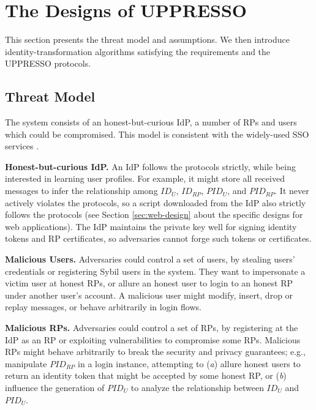 
\section{The Designs of UPPRESSO}
\label{sec:UPPRESSO}

This section presents the threat model and assumptions.
We then introduce identity-transformation algorithms satisfying the requirements
    and the UPPRESSO protocols.


\subsection{Threat Model}
The system consists of an honest-but-curious IdP, a number of RPs and users which could be compromised. %
This model is consistent with the widely-used SSO services \cite{OpenIDConnect,rfc6749,SAML,SAMLIdentifier,NIST2017draft}.

\noindent \textbf{Honest-but-curious IdP.}
An IdP follows the protocols strictly, while being interested in learning user profiles.
For example, it might store all received messages
 to infer the relationship among $ID_U$, $ID_{RP}$, $PID_{U}$, and $PID_{RP}$.
It never actively violates the protocols,
so a script downloaded from the IdP also strictly follows the protocols (see Section \ref{sec:web-design} about the specific designs
    for web applications).
The IdP maintains the private key well for signing identity tokens and RP certificates, %
so adversaries cannot forge such tokens or certificates.

\noindent \textbf{Malicious Users.}
Adversaries could control a set of users,
 by stealing users' credentials or registering Sybil users in the system.
They want to impersonate a victim user at honest RPs,
 or allure an honest user to login to an honest RP under another user's account.
A malicious user might
    modify, insert, drop or replay messages, or behave arbitrarily in login flows.

\noindent \textbf{Malicious RPs.}
Adversaries could control a set of RPs, by registering at the IdP as an RP
     or exploiting vulnerabilities to compromise some RPs.
Malicious RPs might behave arbitrarily to break the security and privacy guarantees;
e.g., manipulate $PID_{RP}$ in a login instance,
    attempting to (\emph{a}) allure honest users to return an identity token that might be accepted by some honest RP,
or (\emph{b}) influence the generation of $PID_U$ to
    analyze the relationship between $ID_U$ and $PID_U$.


